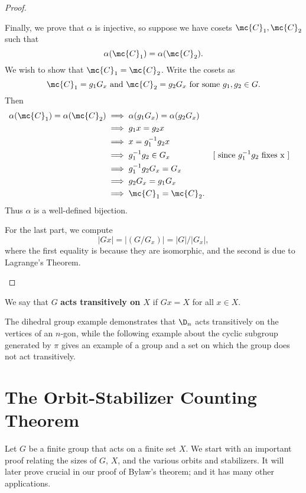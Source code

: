 \documentclass[math1530-lecture-notes]{subfiles}
\begin{document}
\begin{proof}[Proof]
\begin{enumerate}
      Finally, we prove that $\alpha$ is injective, so suppose we have cosets $\mc{C}_1, \mc{C}_2$
      such that \[
        \alpha(\mc{C}_1)=\alpha(\mc{C}_2)
      .\] We wish to show that $\mc{C}_1=\mc{C}_2$. Write the cosets as \[
        \mc{C}_1=g_1G_x~\text{and}~\mc{C}_2=g_2G_x~\text{for some}~g_1,g_2\in G
      .\] Then
      \begin{align*}
        \alpha(\mc{C}_1)=\alpha(\mc{C}_2)&\implies \alpha(g_1G_x)=\alpha(g_2G_x)\\
                                         &\implies g_1x=g_2x\\
                                         &\implies x=g_1^{-1}g_2x\\
                                         &\implies g_1^{-1}g_2\in G_x&&[~\text{since $g_1^{-1}g_2$
                                         fixes x}~]\\
                                         &\implies g_1^{-1}g_2G_x=G_x\\
                                         &\implies g_2G_x=g_1G_x\\
                                         &\implies \mc{C}_1=\mc{C}_2
      .\end{align*} Thus $\alpha$ is a well-defined bijection.

      For the last part, we compute \[
        \left| Gx \right| =\left| (G / G_x) \right| =\left| G \right| /\left| G_x \right| 
      ,\] where the first equality is because they are isomorphic, and the second is due to
      Lagrange's Theorem.
  \end{enumerate}
\end{proof}

\begin{definition}[Transitivity]{}
  We say that $G$ \textbf{acts transitively on $X$} if $Gx=X$ for all $x\in X$.
\end{definition}

The dihedral group example demonstrates that $\D_n$ acts transitively on the vertices of an $n$-gon,
while the following example about the cyclic subgroup generated by $\pi$ gives an example of a group
and a set on which the group does not act transitively.


\section{The Orbit-Stabilizer Counting Theorem}

Let $G$ be a finite group that acts on a finite set $X$. We start with an important proof relating
the sizes of $G$, $X$, and the various orbits and stabilizers. It will later prove crucial in our
proof of Bylaw's theorem; and it has many other applications.
\end{document}
